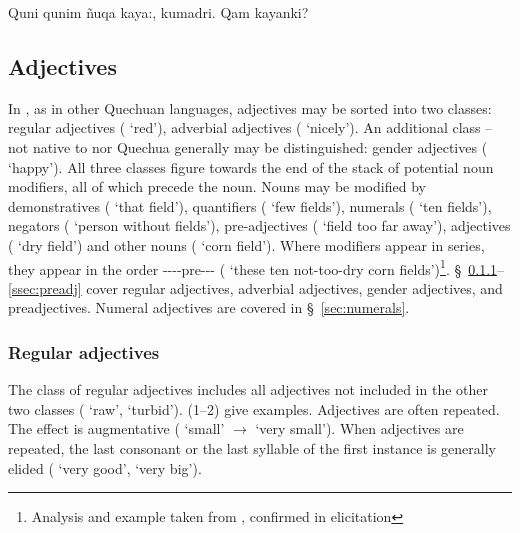 {%
{Quni qunim \~nuqa kaya:, kumadri. \textquestiondown{}Qam  kayanki?}%
{}%
{}{}%

\subsection{Adjectives}
In \SYQ{}, as in other Quechuan languages, adjectives may be sorted into two classes: regular adjectives ( `red'), adverbial adjectives ( `nicely'). An additional class -- not native to \SYQ{} nor Quechua generally may be distinguished: gender adjectives ( `happy'). All three classes figure towards the end of the stack of potential noun modifiers, all of which precede the noun. Nouns may be modified by demonstratives (  `that field'), quantifiers (  `few fields'), numerals (  `ten fields'), negators (  `person without fields'), pre-adjectives (   `field too far away'), adjectives (  `dry field') and other nouns (  `corn field'). Where modifiers appear in series, they appear in the order ----pre--- (       `these ten not-too-dry corn fields')\footnote{Analysis and example taken from \citet{Parker76gram}, confirmed in elicitation}. \S~\ref{ssec:regadj}--\ref{ssec:preadj} cover regular adjectives, adverbial adjectives, gender adjectives, and preadjectives. Numeral adjectives are covered in \S~\ref{sec:numerals}.

\subsubsection{Regular adjectives}\label{ssec:regadj}
The class of regular adjectives includes all adjectives not included in the other two classes ( `raw',  `turbid'). (1--2) give examples. Adjectives are often repeated. The effect is augmentative ( `small' $\rightarrow$  `very small'). When adjectives are repeated, the last consonant or the last syllable of the first instance is generally elided ( `very good',  `very big').

}
